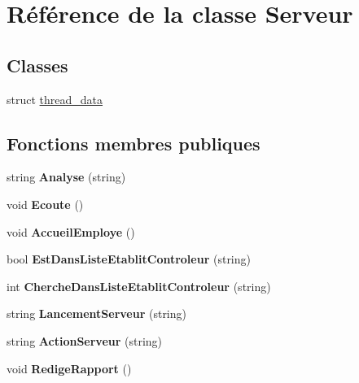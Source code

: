 \hypertarget{class_serveur}{\section{Référence de la classe Serveur}
\label{class_serveur}
}
\subsection*{Classes}
\begin{DoxyCompactItemize}
\item 
struct \hyperlink{struct_serveur_1_1thread__data}{thread\-\_\-data}
\end{DoxyCompactItemize}
\subsection*{Fonctions membres publiques}
\begin{DoxyCompactItemize}
\item 
\hypertarget{class_serveur_a770b3b736207e2e0f4e99a44e6dbfbcf}{string {\bfseries Analyse} (string)}\label{class_serveur_a770b3b736207e2e0f4e99a44e6dbfbcf}

\item 
\hypertarget{class_serveur_af4e624ed5818b967f99c5abbc966212c}{void {\bfseries Ecoute} ()}\label{class_serveur_af4e624ed5818b967f99c5abbc966212c}

\item 
\hypertarget{class_serveur_a4ebd92717a7ee46a363f5c1816a99f56}{void {\bfseries Accueil\-Employe} ()}\label{class_serveur_a4ebd92717a7ee46a363f5c1816a99f56}

\item 
\hypertarget{class_serveur_a5950c36f0775a3c5b01f22ceaa443171}{bool {\bfseries Est\-Dans\-Liste\-Etablit\-Controleur} (string)}\label{class_serveur_a5950c36f0775a3c5b01f22ceaa443171}

\item 
\hypertarget{class_serveur_a1d08a6af05112c72e679f9e2c7223850}{int {\bfseries Cherche\-Dans\-Liste\-Etablit\-Controleur} (string)}\label{class_serveur_a1d08a6af05112c72e679f9e2c7223850}

\item 
\hypertarget{class_serveur_a5b54a380c06fa431c7adb18b6b7b9eda}{string {\bfseries Lancement\-Serveur} (string)}\label{class_serveur_a5b54a380c06fa431c7adb18b6b7b9eda}

\item 
\hypertarget{class_serveur_abc20e0793f7907e8d8b1596f6046aa47}{string {\bfseries Action\-Serveur} (string)}\label{class_serveur_abc20e0793f7907e8d8b1596f6046aa47}

\item 
\hypertarget{class_serveur_a36263ad96b1619d079ec49c54773496f}{void {\bfseries Redige\-Rapport} ()}\label{class_serveur_a36263ad96b1619d079ec49c54773496f}

\end{DoxyCompactItemize}
